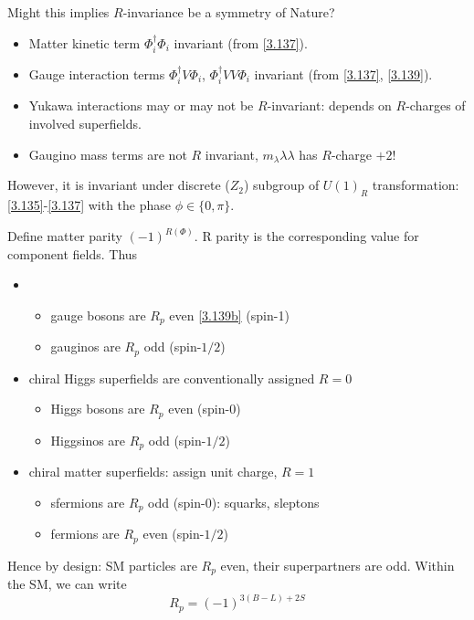 Might this implies $R$-invariance be a symmetry of Nature?
\begin{itemize}
   \item Matter kinetic term $\Phi_i^\dagger \Phi_i$ invariant (from \eqref{3.137}).
   \item Gauge interaction terms $\Phi^\dagger_i V \Phi_i$, $\Phi_i^\dagger V V \Phi_i$ invariant (from \eqref{3.137}, \eqref{3.139}).
   \item Yukawa interactions may or may not be $R$-invariant: depends on $R$-charges of involved superfields.
   \item Gaugino mass terms are not $R$ invariant, $m_\lambda \lambda \lambda$ has $R$-charge $+2$!
\end{itemize}

However, it is invariant under discrete ($Z_2$) subgroup of $U(1)_R$ transformation: \eqref{3.135}-\eqref{3.137} with the phase $\phi \in \{0, \pi \}$.

Define matter parity $(-1)^{R(\Phi)}$. R parity is the corresponding value for component fields. Thus
\begin{itemize}
   \item
   \begin{itemize}
      \item gauge bosons are $R_p$ even \eqref{3.139b} (spin-1)
      \item gauginos are $R_p$ odd (spin-$1/2$)
   \end{itemize}
   \item chiral Higgs superfields are conventionally assigned $R=0$
      \begin{itemize}
         \item  Higgs bosons are $R_p$ even (spin-$0$)
         \item Higgsinos are $R_p$ odd (spin-$1/2$)
      \end{itemize}
   \item chiral matter superfields: assign unit charge, $R=1$
      \begin{itemize}
         \item sfermions are $R_p$ odd (spin-$0$): squarks, sleptons
         \item fermions are $R_p$ even (spin-$1/2$)
      \end{itemize}
\end{itemize}
Hence by design: SM particles are $R_p$ even, their superpartners are odd. Within the SM, we can write
\begin{equation}
   R_p = (-1)^{3(B-L)+2S} \label{3.140}
\end{equation}

